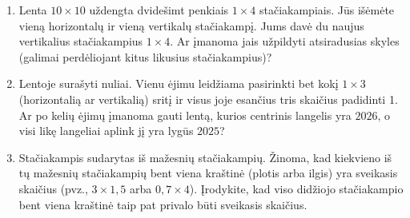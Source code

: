 \documentclass[11pt,a4paper]{scrartcl}
\begin{document}
\begin{enumerate}
    \item Lenta $10 \times 10$ uždengta dvidešimt penkiais $1 \times 4$ stačiakampiais. Jūs išėmėte vieną horizontalų ir vieną vertikalų stačiakampį. Jums davė du naujus vertikalius stačiakampius $1 \times 4$. Ar įmanoma jais užpildyti atsiradusias skyles (galimai perdėliojant kitus likusius stačiakampius)?
    \item Lentoje surašyti nuliai. Vienu ėjimu leidžiama pasirinkti bet kokį $1 \times 3$ (horizontalią ar vertikalią) sritį ir visus joje esančius tris skaičius padidinti 1. Ar po kelių ėjimų įmanoma gauti lentą, kurios centrinis langelis yra $2026$, o visi likę langeliai aplink jį yra lygūs $2025$?
    \item Stačiakampis sudarytas iš mažesnių stačiakampių. Žinoma, kad kiekvieno iš tų mažesnių stačiakampių bent viena kraštinė (plotis arba ilgis) yra sveikasis skaičius (pvz., $3 \times 1{,}5$ arba $0{,}7 \times 4$). Įrodykite, kad viso didžiojo stačiakampio bent viena kraštinė taip pat privalo būti sveikasis skaičius.
\end{enumerate}
\end{document}
